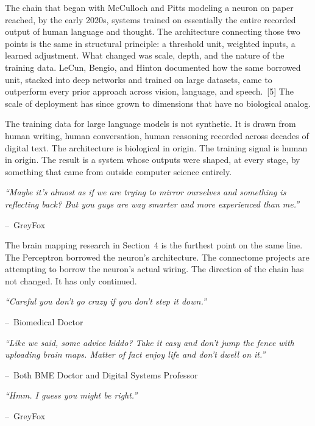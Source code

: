 \documentclass[11pt,a4paper]{article}
\renewenvironment{quote}
  {\list{}{\leftmargin=2.2em\rightmargin=2.2em\topsep=0.4em\parsep=0.3em}%
   \item\relax\itshape}
  {\endlist}
\newcommand{\attrib}[1]{\par\vspace{0.2em}\normalfont\small\hspace*{0em}--\ #1\par}
\begin{document}
The chain that began with McCulloch and Pitts modeling a neuron on paper reached, by the early 2020s, systems trained on essentially the entire recorded output of human language and thought. The architecture connecting those two points is the same in structural principle: a threshold unit, weighted inputs, a learned adjustment. What changed was scale, depth, and the nature of the training data. LeCun, Bengio, and Hinton documented how the same borrowed unit, stacked into deep networks and trained on large datasets, came to outperform every prior approach across vision, language, and speech.~[5] The scale of deployment has since grown to dimensions that have no biological analog.

The training data for large language models is not synthetic. It is drawn from human writing, human conversation, human reasoning recorded across decades of digital text. The architecture is biological in origin. The training signal is human in origin. The result is a system whose outputs were shaped, at every stage, by something that came from outside computer science entirely.

\begin{quote}
``Maybe it's almost as if we are trying to mirror ourselves and something is reflecting back? But you guys are way smarter and more experienced than me.''
\attrib{GreyFox}
\end{quote}

The brain mapping research in Section~4 is the furthest point on the same line. The Perceptron borrowed the neuron's architecture. The connectome projects are attempting to borrow the neuron's actual wiring. The direction of the chain has not changed. It has only continued.

\begin{quote}
``Careful you don't go crazy if you don't step it down.''
\attrib{Biomedical Doctor}
\end{quote}

\begin{quote}
``Like we said, some advice kiddo? Take it easy and don't jump the fence with uploading brain maps. Matter of fact enjoy life and don't dwell on it.''
\attrib{Both BME Doctor and Digital Systems Professor}
\end{quote}

\begin{quote}
``Hmm. I guess you might be right.''
\attrib{GreyFox}
\end{quote}

\end{document}
